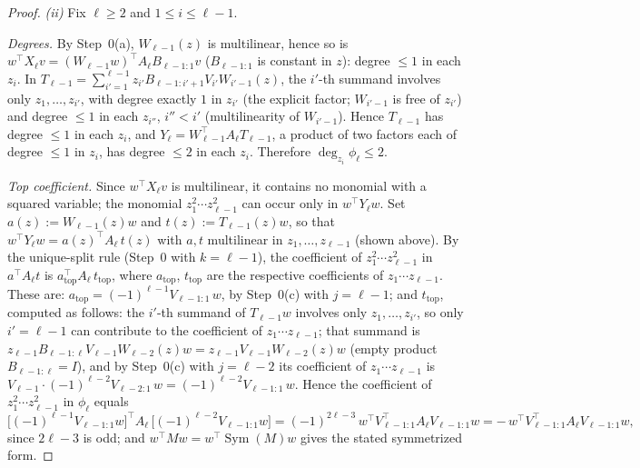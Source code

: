 \documentclass[11pt]{article}
\theoremstyle{definition}
\theoremstyle{remark}
\theoremstyle{plain}
\newcommand{\Sym}{\operatorname{Sym}}
\begin{document}
\begin{proof}
\emph{(ii)}  Fix $\ell\ge2$ and $1\le i\le\ell-1$.

\emph{Degrees.}  By Step~0(a), $W_{\ell-1}(z)$ is multilinear, hence so is
$w^\top X_\ell v=(W_{\ell-1}w)^\top A_\ell B_{\ell-1:1}v$ ($B_{\ell-1:1}$ is constant in
$z$): degree $\le1$ in each $z_i$.  In
$T_{\ell-1}=\sum_{i'=1}^{\ell-1}z_{i'}B_{\ell-1:i'+1}V_{i'}W_{i'-1}(z)$, the $i'$-th
summand involves only $z_1,\dots,z_{i'}$, with degree exactly $1$ in $z_{i'}$ (the
explicit factor; $W_{i'-1}$ is free of $z_{i'}$) and degree $\le1$ in each $z_{i''}$,
$i''<i'$ (multilinearity of $W_{i'-1}$).  Hence $T_{\ell-1}$ has degree $\le1$ in each
$z_i$, and $Y_\ell=W_{\ell-1}^\top A_\ell T_{\ell-1}$, a product of two factors each of
degree $\le1$ in $z_i$, has degree $\le2$ in each $z_i$.  Therefore
$\deg_{z_i}\phi_\ell\le2$.

\emph{Top coefficient.}  Since $w^\top X_\ell v$ is multilinear, it contains no monomial
with a squared variable; the monomial $z_1^2\cdots z_{\ell-1}^2$ can occur only in
$w^\top Y_\ell w$.  Set $a(z):=W_{\ell-1}(z)w$ and $t(z):=T_{\ell-1}(z)w$, so that
$w^\top Y_\ell w=a(z)^\top A_\ell\,t(z)$ with $a,t$ multilinear in $z_1,\dots,z_{\ell-1}$
(shown above).  By the unique-split rule (Step~0 with $k=\ell-1$), the coefficient of
$z_1^2\cdots z_{\ell-1}^2$ in $a^\top A_\ell t$ is
$a_{\mathrm{top}}^\top A_\ell\,t_{\mathrm{top}}$, where $a_{\mathrm{top}}$,
$t_{\mathrm{top}}$ are the respective coefficients of $z_1\cdots z_{\ell-1}$.  These are:
$a_{\mathrm{top}}=(-1)^{\ell-1}V_{\ell-1:1}\,w$, by Step~0(c) with $j=\ell-1$; and
$t_{\mathrm{top}}$, computed as follows: the $i'$-th summand of $T_{\ell-1}w$ involves
only $z_1,\dots,z_{i'}$, so only $i'=\ell-1$ can contribute to the coefficient of
$z_1\cdots z_{\ell-1}$; that summand is
$z_{\ell-1}B_{\ell-1:\ell}V_{\ell-1}W_{\ell-2}(z)w=z_{\ell-1}V_{\ell-1}W_{\ell-2}(z)w$
(empty product $B_{\ell-1:\ell}=I$), and by Step~0(c) with $j=\ell-2$ its coefficient of
$z_1\cdots z_{\ell-1}$ is
$V_{\ell-1}\cdot(-1)^{\ell-2}V_{\ell-2:1}\,w=(-1)^{\ell-2}V_{\ell-1:1}\,w$.
Hence the coefficient of $z_1^2\cdots z_{\ell-1}^2$ in $\phi_\ell$ equals
\[
\big[(-1)^{\ell-1}V_{\ell-1:1}w\big]^\top A_\ell\,\big[(-1)^{\ell-2}V_{\ell-1:1}w\big]
=(-1)^{2\ell-3}\,w^\top V_{\ell-1:1}^\top A_\ell V_{\ell-1:1}w
=-\,w^\top V_{\ell-1:1}^\top A_\ell V_{\ell-1:1}w,
\]
since $2\ell-3$ is odd; and $w^\top Mw=w^\top\Sym(M)w$ gives the stated symmetrized form.


\end{proof}
\end{document}
